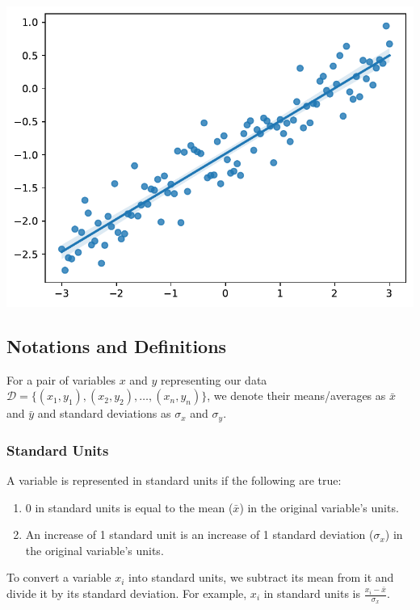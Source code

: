 \documentclass[
  letterpaper,
  DIV=11,
  numbers=noendperiod]{scrreprt}
\providecommand{\tightlist}{%
  \setlength{\itemsep}{0pt}\setlength{\parskip}{0pt}}\usepackage{longtable,booktabs,array}
\begin{document}
\includegraphics{intro_to_modeling/intro_to_modeling_files/figure-pdf/cell-2-output-1.pdf}

\subsection{Notations and Definitions}\label{notations-and-definitions}

For a pair of variables \(x\) and \(y\) representing our data
\(\mathcal{D} = \{(x_1, y_1), (x_2, y_2), \dots, (x_n, y_n)\}\), we
denote their means/averages as \(\bar x\) and \(\bar y\) and standard
deviations as \(\sigma_x\) and \(\sigma_y\).

\subsubsection{Standard Units}\label{standard-units}

A variable is represented in standard units if the following are true:

\begin{enumerate}
\def\labelenumi{\arabic{enumi}.}
\tightlist
\item
  0 in standard units is equal to the mean (\(\bar{x}\)) in the original
  variable's units.
\item
  An increase of 1 standard unit is an increase of 1 standard deviation
  (\(\sigma_x\)) in the original variable's units.
\end{enumerate}

To convert a variable \(x_i\) into standard units, we subtract its mean
from it and divide it by its standard deviation. For example, \(x_i\) in
standard units is \(\frac{x_i - \bar x}{\sigma_x}\).
\end{document}
